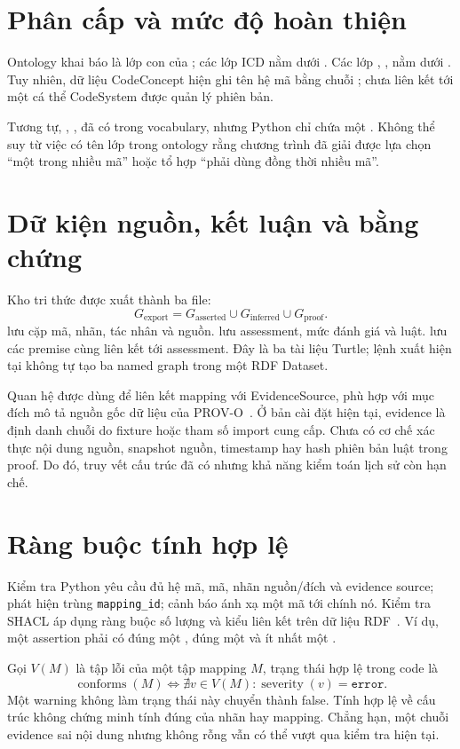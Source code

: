 \section{Phân cấp và mức độ hoàn thiện}
Ontology khai báo  là lớp con của
; các lớp ICD nằm dưới .
Các lớp , ,
 nằm dưới .
Tuy nhiên, dữ liệu CodeConcept hiện ghi tên hệ mã bằng chuỗi
; chưa liên kết tới một cá thể CodeSystem được quản lý phiên bản.

Tương tự, , ,  đã có
trong vocabulary, nhưng  Python chỉ chứa một
. Không thể suy từ việc có tên lớp trong ontology rằng
chương trình đã giải được lựa chọn “một trong nhiều mã” hoặc tổ hợp
“phải dùng đồng thời nhiều mã”.

\section{Dữ kiện nguồn, kết luận và bằng chứng}
Kho tri thức được xuất thành ba file:
\begin{equation}
  G_{\mathrm{export}}=G_{\mathrm{asserted}}\cup
  G_{\mathrm{inferred}}\cup G_{\mathrm{proof}}.
\end{equation}
 lưu cặp mã, nhãn, tác nhân và nguồn.
 lưu assessment, mức đánh giá và luật.
 lưu các premise cùng liên kết tới assessment.
Đây là ba tài liệu Turtle; lệnh xuất hiện tại không tự tạo ba named graph
trong một RDF Dataset.

Quan hệ  được dùng để liên kết mapping với
EvidenceSource, phù hợp với mục đích mô tả nguồn gốc dữ liệu của
PROV-O~\cite{provo}. Ở bản cài đặt hiện tại, evidence là định danh chuỗi
do fixture hoặc tham số import cung cấp. Chưa có cơ chế xác thực nội dung
nguồn, snapshot nguồn, timestamp hay hash phiên bản luật trong proof.
Do đó, truy vết cấu trúc đã có nhưng khả năng kiểm toán lịch sử còn hạn chế.

\section{Ràng buộc tính hợp lệ}
Kiểm tra Python yêu cầu đủ hệ mã, mã, nhãn nguồn/đích và evidence source;
phát hiện trùng \texttt{mapping\_id}; cảnh báo ánh xạ một mã tới chính nó.
Kiểm tra SHACL áp dụng ràng buộc số lượng và kiểu liên kết trên dữ liệu
RDF~\cite{shacl}. Ví dụ, một assertion phải có đúng một ,
đúng một  và ít nhất một .

Gọi $V(M)$ là tập lỗi của một tập mapping $M$, trạng thái hợp lệ trong code là
\begin{equation}
  \operatorname{conforms}(M)
  \iff \nexists v\in V(M):\operatorname{severity}(v)=\texttt{error}.
\end{equation}
Một warning không làm trạng thái này chuyển thành false.
Tính hợp lệ về cấu trúc không chứng minh tính đúng của nhãn hay mapping.
Chẳng hạn, một chuỗi evidence sai nội dung nhưng không rỗng vẫn có thể
vượt qua kiểm tra hiện tại.
